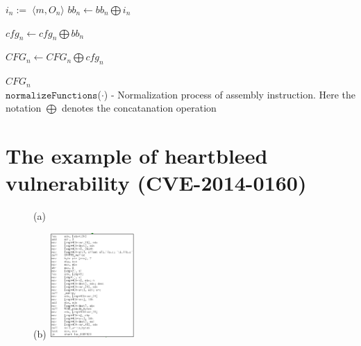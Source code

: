 \begin{appendices}
{\begin{MyAlgo}[!ht]{-4.9cm}
{{{{{{%
    				}
  				}
  				
  			}
  			$i_n := \; \langle m, O_n\rangle$\;
  			$bb_n \longleftarrow bb_n \bigoplus i_n$ \;
   		}
   		$cfg_n \longleftarrow cfg_n \bigoplus  bb_n$ \;
   	}
   	$CFG_n \longleftarrow CFG_n \bigoplus  cfg_n$ \;
   }
  \Return ${CFG_n}$
  \\
 \caption{$\mathtt{normalizeFunctions}$($\cdot$) - Normalization process of assembly instruction. Here the notation $\bigoplus$ denotes the concatanation operation}\label{algo:norm}
\end{MyAlgo}
}

 \onecolumn
  \section{The example of heartbleed vulnerability (CVE-2014-0160)}
\begin{figure}[ht]
 \begin{minipage}{.3\textwidth}

   (a)
\end{minipage}
 \begin{minipage}{.3\textwidth}
  \centering
     (b)
  \includegraphics[height=4cm]{srj-figures/srj-gcc.png}
  \end{minipage}
  \begin{minipage}{.3\textwidth}


\end{minipage}
\end{figure}
\end{appendices}
